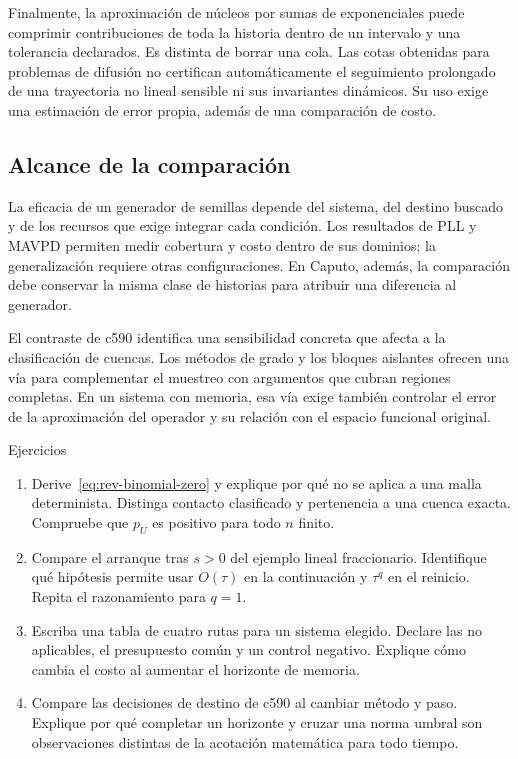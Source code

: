 Finalmente, la aproximación de núcleos por sumas de exponenciales
\cite{JiangZhangZhangZhang2017FastCaputo} puede comprimir contribuciones de
toda la historia dentro de un intervalo y una tolerancia declarados. Es
distinta de borrar una cola. Las cotas obtenidas para problemas de difusión
no certifican automáticamente el seguimiento prolongado de una trayectoria
no lineal sensible ni sus invariantes dinámicos. Su uso exige una estimación
de error propia, además de una comparación de costo.

\subsection{Alcance de la comparación}

La eficacia de un generador de semillas depende del sistema, del destino
buscado y de los recursos que exige integrar cada condición. Los resultados
de PLL y MAVPD permiten medir cobertura y costo dentro de sus dominios;
la generalización requiere otras configuraciones. En Caputo, además,
la comparación debe conservar la misma clase de historias para atribuir
una diferencia al generador.

El contraste de c590 identifica una sensibilidad concreta que afecta a
la clasificación de cuencas. Los métodos de grado y los bloques aislantes
ofrecen una vía para complementar el muestreo con argumentos que cubran
regiones completas. En un sistema con memoria, esa vía exige también
controlar el error de la aproximación del operador y su relación con
el espacio funcional original.

\ifHAFOPedagogy
\begin{bloqueestudio}{Ejercicios}
\begin{enumerate}
 \item Derive~\eqref{eq:rev-binomial-zero} y explique por qué no se aplica a
 una malla determinista. Distinga contacto clasificado y pertenencia a una
 cuenca exacta. Compruebe que $p_U$ es positivo para todo $n$ finito.
 \item Compare el arranque tras $s>0$ del ejemplo lineal fraccionario.
 Identifique qué hipótesis permite usar $O(\tau)$ en la continuación y
 $\tau^q$ en el reinicio. Repita el razonamiento para $q=1$.
 \item Escriba una tabla de cuatro rutas para un sistema elegido. Declare
 las no aplicables, el presupuesto común y un control negativo. Explique cómo cambia el costo al aumentar el horizonte de memoria.
 \item Compare las decisiones de destino de c590 al cambiar método y paso.
 Explique por qué completar un horizonte y cruzar una norma umbral son
 observaciones distintas de la acotación matemática para todo tiempo.
\end{enumerate}
\end{bloqueestudio}
\fi
